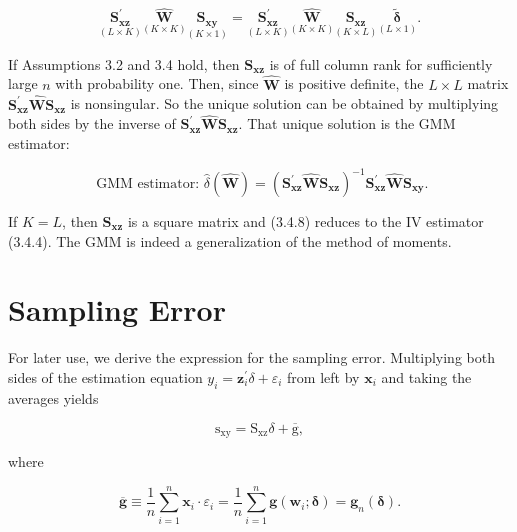 \documentclass[10pt]{article}
\begin{document}
\begin{equation*}
\underset{(L \times K)}{\mathbf{S}_{\mathbf{x z}}^{\prime}} \underset{(K \times K)}{\widehat{\mathbf{W}}} \underset{(K \times 1)}{\mathbf{S}_{\mathbf{x y}}}=\underset{(L \times K)}{\mathbf{S}_{\mathbf{x z}}^{\prime}} \underset{(K \times K)}{\widehat{\mathbf{W}}} \underset{(K \times L)}{\mathbf{S}_{\mathbf{x z}}} \underset{(L \times 1)}{\tilde{\boldsymbol{\delta}}} . \tag{3.4.7}
\end{equation*}


If Assumptions 3.2 and 3.4 hold, then $\mathbf{S}_{\mathbf{x z}}$ is of full column rank for sufficiently large $n$ with probability one. Then, since $\widehat{\mathbf{W}}$ is positive definite, the $L \times L$ matrix $\mathbf{S}_{\mathbf{x z}}^{\prime} \widehat{\mathbf{W}} \mathbf{S}_{\mathbf{x z}}$ is nonsingular. So the unique solution can be obtained by multiplying both sides by the inverse of $\mathbf{S}_{\mathbf{x z}}^{\prime} \widehat{\mathbf{W}} \mathbf{S}_{\mathbf{x z}}$. That unique solution is the GMM estimator:


\begin{equation*}
\text { GMM estimator: } \hat{\delta}(\widehat{\mathbf{W}})=\left(\mathbf{S}_{\mathbf{x z}}^{\prime} \widehat{\mathbf{W}} \mathbf{S}_{\mathbf{x z}}\right)^{-1} \mathbf{S}_{\mathbf{x z}}^{\prime} \widehat{\mathbf{W}} \mathbf{S}_{\mathbf{x y}} . \tag{3.4.8}
\end{equation*}


If $K=L$, then $\mathbf{S}_{\mathbf{x z}}$ is a square matrix and (3.4.8) reduces to the IV estimator (3.4.4). The GMM is indeed a generalization of the method of moments.

\section*{Sampling Error}
For later use, we derive the expression for the sampling error. Multiplying both sides of the estimation equation $y_{i}=\mathbf{z}_{i}^{\prime} \delta+\varepsilon_{i}$ from left by $\mathbf{x}_{i}$ and taking the averages yields


\begin{equation*}
\mathrm{s}_{\mathrm{xy}}=\mathrm{S}_{\mathrm{xz}} \delta+\overline{\mathrm{g}}, \tag{3.4.9}
\end{equation*}


where


\begin{equation*}
\overline{\mathbf{g}} \equiv \frac{1}{n} \sum_{i=1}^{n} \mathbf{x}_{i} \cdot \varepsilon_{i}=\frac{1}{n} \sum_{i=1}^{n} \mathbf{g}\left(\mathbf{w}_{i} ; \boldsymbol{\delta}\right)=\mathbf{g}_{n}(\boldsymbol{\delta}) . \tag{3.4.10}
\end{equation*}
\end{document}
